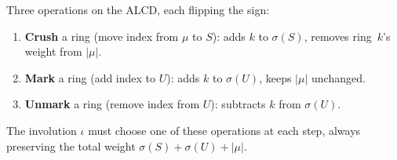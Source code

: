 \documentclass[11pt]{article}
\begin{document}
\medskip\noindent
Three operations on the ALCD, each flipping the sign:
\begin{enumerate}
  \item \textbf{Crush} a ring (move index from
    $\mu$ to $S$): adds $k$ to $\sigma(S)$, removes
    ring~$k$'s weight from $|\mu|$.
  \item \textbf{Mark} a ring (add index to $U$):
    adds $k$ to $\sigma(U)$, keeps $|\mu|$ unchanged.
  \item \textbf{Unmark} a ring (remove index from $U$):
    subtracts $k$ from $\sigma(U)$.
\end{enumerate}
The involution $\iota$ must choose one of these operations
at each step, always preserving the total weight
$\sigma(S) + \sigma(U) + |\mu|$.
\end{document}
